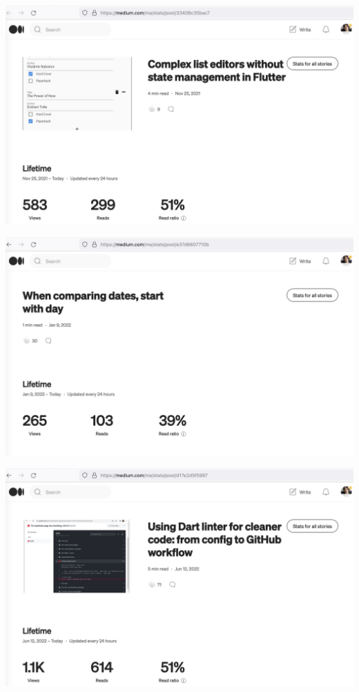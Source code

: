 
\begin{center}
    \includegraphics[width=\textwidth]{2021-11-25_editors}
\end{center}

\begin{center}
    \includegraphics[width=\textwidth]{2022-01-09_dates}
\end{center}

\begin{center}
    \includegraphics[width=\textwidth]{2022-06-12_linter}
\end{center}


